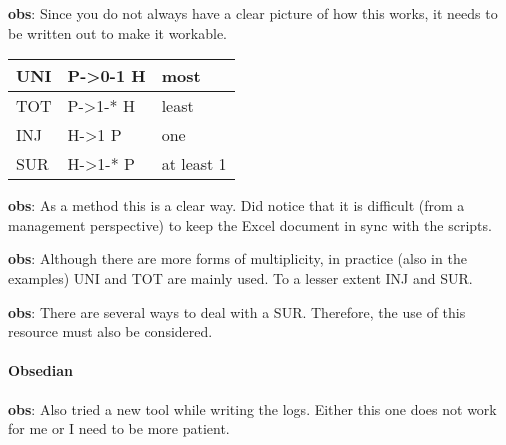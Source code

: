 \begin{obs}\label{obs:rq2-5:2-10}
    \textbf{obs}: Since you do not always have a clear picture of how this works, it needs to be written out to make it workable.\\
    \begin{tabular}{ || l | l | l ||}
    \hline
    UNI & P->0-1 H &  most\\  \hline    
    TOT & P->1-* H  & least\\  \hline
    INJ & H->1 P  &   one\\  \hline
    SUR & H->1-* P &  at least 1\\ \hline
    \end{tabular}
\end{obs}
    
\begin{obs}\label{obs:rq1-3}
    \textbf{obs}: As a method this is a clear way.
    Did notice that it is difficult (from a management perspective) to keep the Excel document in sync with the scripts.
\end{obs}

\begin{obs}\label{obs:rq2-2}
    \textbf{obs}: Although there are more forms of {multiplicity}, in practice (also in the examples) UNI and TOT are mainly used.
    To a lesser extent INJ and SUR.
\end{obs}

\begin{obs}\label{obs:rq2-13:19-10}
    \textbf{obs}: There are several ways to deal with a SUR.
    Therefore, the use of this resource must also be considered.
\end{obs}

\paragraph{Obsedian}
\begin{obs}\label{obs:rq1-88:5-12}
    \textbf{obs}: Also tried a new tool while writing the logs.
    Either this one does not work for me or I need to be more patient.
\end{obs}

